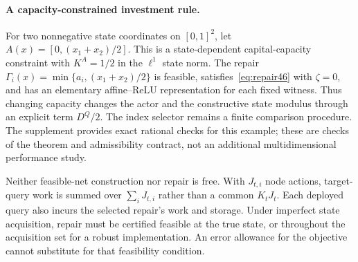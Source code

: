 \paragraph{A capacity-constrained investment rule.}
For two nonnegative state coordinates on $[0,1]^2$, let $A(x)=[0,(x_1+x_2)/2]$. This is a state-dependent capital-capacity constraint with $K^A=1/2$ in the $\ell^1$ state norm. The repair $\Gamma_i(x)=\min\{a_i,(x_1+x_2)/2\}$ is feasible, satisfies~\eqref{eq:repair46} with $\zeta=0$, and has an elementary affine--ReLU representation for each fixed witness. Thus changing capacity changes the actor and the constructive state modulus through an explicit term $D^Q/2$. The index selector remains a finite comparison procedure. The supplement provides exact rational checks for this example; these are checks of the theorem and admissibility contract, not an additional multidimensional performance study.

Neither feasible-net construction nor repair is free. With $J_{t,i}$ node actions, target-query work is summed over $\sum_iJ_{t,i}$ rather than a common $K_tJ_t$. Each deployed query also incurs the selected repair's work and storage. Under imperfect state acquisition, repair must be certified feasible at the true state, or throughout the acquisition set for a robust implementation. An error allowance for the objective cannot substitute for that feasibility condition.
